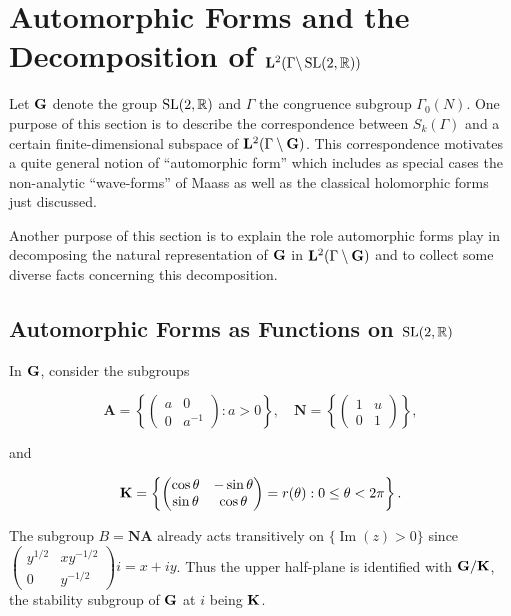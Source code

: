 \chapter{Automorphic Forms and the Decomposition of \texorpdfstring{$\mathbf{L}^2(\Gamma\backslash \operatorname{SL}(2,\mathbb{R}))$}{L2(Gamma SL(2,R))}}

\label{ch:2}

Let $\mathbf{G}$ denote the group $\operatorname{SL}(2,\mathbb{R})$ and $\Gamma$ the congruence subgroup $\Gamma_0(N)$. One purpose of this section is to describe the correspondence between $S_k(\Gamma)$ and a certain finite-dimensional subspace of $\mathbf{L}^2(\Gamma \setminus \mathbf{G})$. This correspondence motivates a quite general notion of ``automorphic form'' which includes as special cases the non-analytic ``wave-forms'' of Maass as well as the classical holomorphic forms just discussed.

Another purpose of this section is to explain the role automorphic forms play in decomposing the natural representation of $\mathbf{G}$ in $\mathbf{L}^2(\Gamma \setminus \mathbf{G})$ and to collect some diverse facts concerning this decomposition.

\section{Automorphic Forms as Functions on \texorpdfstring{$\operatorname{SL}(2,\mathbb{R})$}{SL(2,R)}}\label{sec:2a}

In $\mathbf{G}$, consider the subgroups

\[
\mathbf{A} = \left\{\begin{pmatrix} a & 0 \\ 0 & a^{-1} \end{pmatrix}: a > 0\right\}, \quad \mathbf{N} = \left\{\begin{pmatrix} 1 & u \\ 0 & 1 \end{pmatrix}\right\},
\]

and

\[
\mathbf{K} = \left\{\begin{pmatrix} \cos\theta & -\sin\theta \\ \sin\theta & \cos\theta \end{pmatrix} = r(\theta): 0 \leq \theta < 2\pi\right\}.
\]

The subgroup $B = \mathbf{N}\mathbf{A}$ already acts transitively on $\{\operatorname{Im}(z) > 0\}$ since $\begin{pmatrix} y^{1/2} & xy^{-1/2} \\ 0 & y^{-1/2} \end{pmatrix} i = x + iy$. Thus the upper half-plane is identified with $\mathbf{G}/\mathbf{K}$, the stability subgroup of $\mathbf{G}$ at $i$ being $\mathbf{K}$.

